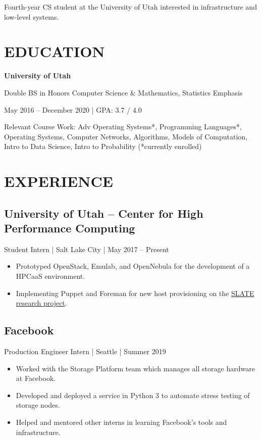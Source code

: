 \documentclass[10pt, letterpaper]{resume}
\begin{document}
\maketitle

{\centering
  Fourth-year CS student at the University of Utah interested in infrastructure and low-level systems.
  \par
}

\section{EDUCATION}
{\centering
  \textbf{University of Utah}

  Double BS in Honors Computer Science \& Mathematics, Statistics Emphasis

  May 2016 -- December 2020 | GPA: 3.7 / 4.0
  \par
}
\vspace{10pt}
{\selectfont Relevant Course Work:}
Adv Operating Systems*, Programming Languages*, Operating Systems, Computer Networks, Algorithms, Models of Computation, Intro to Data Science, Intro to Probability {\footnotesize(*currently enrolled)}

\section{EXPERIENCE}
\subsection{University of Utah -- Center for High Performance Computing}
Student Intern | Salt Lake City | May 2017 -- Present
\begin{itemize}
  \item Prototyped OpenStack, Emulab, and OpenNebula for the development of a HPCaaS environment.
  \item Implementing Puppet and Foreman for new host provisioning on the \href{https://slateci.io}{SLATE research project}.
\end{itemize}

\subsection{Facebook}
Production Engineer Intern | Seattle | Summer 2019
\begin{itemize}
  \item Worked with the Storage Platform team which manages all storage hardware at Facebook.
  \item Developed and deployed a service in Python 3 to automate stress testing of storage nodes.
  \item Helped and mentored other interns in learning Facebook's tools and infrastructure.
\end{itemize}
\end{document}
